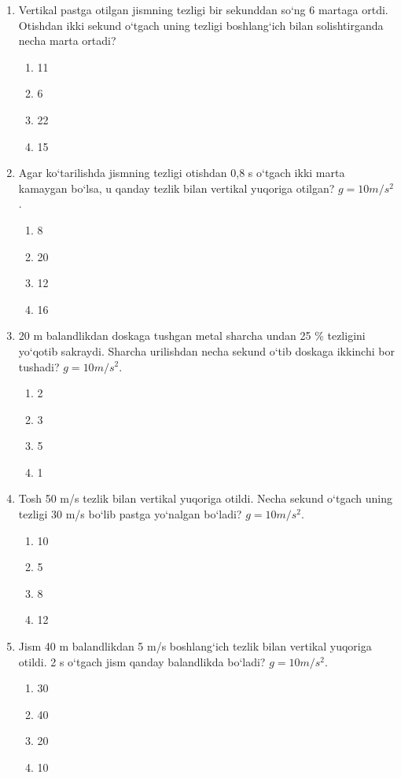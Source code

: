 \begin{enumerate}
\item Vertikal pastga otilgan jismning tezligi bir sekunddan so‘ng 6 martaga ortdi. Otishdan ikki sekund o‘tgach uning tezligi boshlang‘ich bilan solishtirganda necha marta ortadi?
\begin{enumerate}[label=\Alph*)]
\item 11
\item 6
\item 22
\item 15
\end{enumerate}

\item Agar ko‘tarilishda jismning tezligi otishdan 0,8 s o‘tgach ikki marta kamaygan bo‘lsa, u qanday tezlik bilan vertikal yuqoriga otilgan? $g=10 m/s^2$.
\begin{enumerate}[label=\Alph*)]
\item 8
\item 20
\item 12
\item 16
\end{enumerate}

\item 20 m balandlikdan doskaga tushgan metal sharcha undan 25 \% tezligini yo‘qotib sakraydi. Sharcha urilishdan necha sekund o‘tib doskaga ikkinchi bor tushadi? $g=10 m/s^2$.
\begin{enumerate}[label=\Alph*)]
\item 2
\item 3
\item 5
\item 1
\end{enumerate}

\item Tosh 50 m/s tezlik bilan vertikal yuqoriga otildi. Necha sekund o‘tgach uning tezligi 30 m/s bo‘lib pastga yo‘nalgan bo‘ladi? $g=10 m/s^2$.
\begin{enumerate}[label=\Alph*)]
\item 10
\item 5
\item 8
\item 12
\end{enumerate}

\item Jism 40 m balandlikdan 5 m/s boshlang‘ich tezlik bilan vertikal yuqoriga otildi. 2 s o‘tgach jism qanday balandlikda bo‘ladi? $g=10 m/s^2$.
\begin{enumerate}[label=\Alph*)]
\item 30
\item 40
\item 20
\item 10
\end{enumerate}


\end{enumerate}
